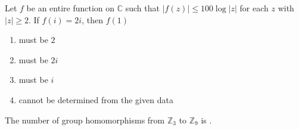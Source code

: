 \item  Let  $f$  be an entire function on $ \mathbb{C} $ such that $ |f(z)| \leq 100 \log |z| $ for each $ z $ with $ |z| \geq 2 $. If $ f(i) = 2i $, then $ f(1) $
\begin{multicols}{2}
\begin{enumerate}
    \item must be $2$ 
    \item must be $2i$
    \item must be $i$ 
    \item cannot be determined from the given data
\end{enumerate}
\end{multicols}
\item The number of group homomorphisms from $ \mathbb{Z}_{3} $ to $ \mathbb{Z}_{9} $ is \underline{\hspace{2cm}}.


